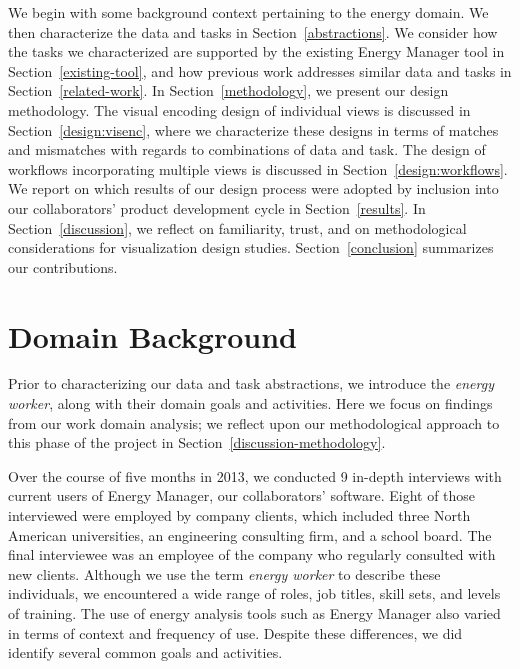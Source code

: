 \documentclass[journal]{vgtc}                %
\newcommand{\bstart}[1]{\vspace{1mm} \noindent{\textbf{#1:}}}
\begin{document}
\bstart{Outline} We begin with some background context pertaining to the energy domain.
We then characterize the data and tasks in Section~\ref{abstractions}.
We consider how the tasks we characterized are supported by the existing Energy Manager tool in Section~\ref{existing-tool}, and how previous work addresses similar data and tasks in Section~\ref{related-work}.
In Section~\ref{methodology}, we present our design methodology. 
The visual encoding design of individual views is discussed in Section~\ref{design:visenc}, where we characterize these designs in terms of matches and mismatches with regards to combinations of data and task.
The design of workflows incorporating multiple views is discussed in Section~\ref{design:workflows}.
We report on which results of our design process were adopted by inclusion into our collaborators' product development cycle in Section~\ref{results}.
In Section~\ref{discussion}, we reflect on familiarity, trust, and on methodological considerations for visualization design studies.
Section~\ref{conclusion} summarizes our contributions.


\section{Domain Background}
\label{domain}


Prior to characterizing our data and task abstractions, we introduce the {\it energy worker}, along with their domain goals and activities.
Here we focus on findings from our work domain analysis; we reflect upon our methodological approach to this phase of the project in Section~\ref{discussion-methodology}. 

Over the course of five months in 2013, we conducted 9 in-depth interviews with current users of Energy Manager, our collaborators' software.
Eight of those interviewed were employed by company clients, which included three North American universities, an engineering consulting firm, and a school board. 
The final interviewee was an employee of the company who regularly consulted with new clients.  
Although we use the term {\it energy worker} to describe these individuals, we encountered a wide range of roles, job titles, skill sets, and levels of training. 
The use of energy analysis tools such as Energy Manager also varied in terms of context and frequency of use.
Despite these differences, we did identify several common goals and activities.
\end{document}
